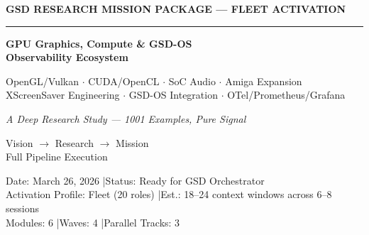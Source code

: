 \documentclass[11pt,letterpaper]{article}
\begin{document}

\thispagestyle{empty}
\begin{center}
\vspace*{2.5cm}

{\small\sffamily\textcolor{primary}{\textbf{GSD RESEARCH MISSION PACKAGE --- FLEET ACTIVATION}}}

\vspace{0.3cm}
\textcolor{bordergray}{\rule{8cm}{0.4pt}}

\vspace{1.5cm}
{\fontsize{26}{32}\selectfont\bfseries\sffamily\textcolor{primary}{GPU Graphics, Compute \& GSD-OS\\[0.3em]Observability Ecosystem}}

\vspace{0.8cm}
{\Large\sffamily\textcolor{secondary}{OpenGL/Vulkan $\cdot$ CUDA/OpenCL $\cdot$ SoC Audio $\cdot$ Amiga Expansion\\[0.2em]XScreenSaver Engineering $\cdot$ GSD-OS Integration $\cdot$ OTel/Prometheus/Grafana}}

\vspace{0.5cm}
{\large\sffamily\itshape\textcolor{tertiary}{A Deep Research Study — 1001 Examples, Pure Signal}}

\vspace{2.5cm}
{\sffamily\textcolor{accent}{Vision $\rightarrow$ Research $\rightarrow$ Mission}}\\[0.3em]
{\small\sffamily\textcolor{accent}{Full Pipeline Execution}}

\vspace{2.5cm}
{\small\sffamily\textcolor{subtlegray}{Date: March 26, 2026 \quad|\quad Status: Ready for GSD Orchestrator}}\\[0.3em]
{\small\sffamily\textcolor{subtlegray}{Activation Profile: Fleet (20 roles) \quad|\quad Est.: 18--24 context windows across 6--8 sessions}}\\[0.3em]
{\small\sffamily\textcolor{subtlegray}{Modules: 6 \quad|\quad Waves: 4 \quad|\quad Parallel Tracks: 3}}
\end{center}
\newpage

\tableofcontents
\newpage
\end{document}
